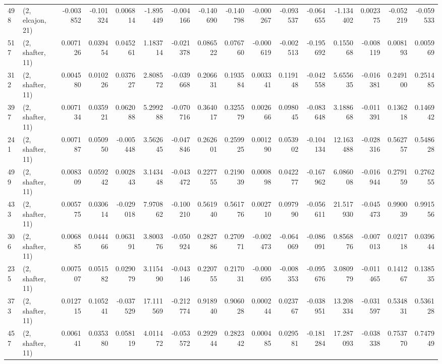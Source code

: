 \begin{tabular}{llrrrrrrrrrrrrrr}
498 &  (2, elcajon, 21) &  -0.003852 & -0.101324 &  0.006814 &   -1.895449 & -0.004166 &  -0.140690 &  -0.140798 & -0.000267 & -0.093537 & -0.064655 &   -1.134402 &  0.002375 &  -0.052219 &  -0.059533 \\
517 &  (2, shafter, 11) &   0.007126 &  0.039454 &  0.045261 &    1.183714 & -0.021378 &   0.086522 &   0.076760 & -0.000619 & -0.002513 & -0.195692 &    0.155068 & -0.008119 &   0.008193 &   0.005969 \\
312 &  (2, shafter, 11) &   0.004580 &  0.010226 &  0.037627 &    2.808572 & -0.039668 &   0.206631 &   0.193584 &  0.003341 &  0.119148 & -0.042558 &    5.655635 & -0.016381 &   0.249100 &   0.251485 \\
397 &  (2, shafter, 11) &   0.007134 &  0.035921 &  0.062088 &    5.299288 & -0.070716 &   0.364017 &   0.325579 &  0.002666 &  0.098045 & -0.083648 &    3.188668 & -0.011391 &   0.136218 &   0.146942 \\
241 &  (2, shafter, 11) &   0.007187 &  0.050950 & -0.005448 &    3.562645 & -0.047846 &   0.262601 &   0.259925 &  0.001290 &  0.053902 & -0.104134 &   12.163488 & -0.028316 &   0.562757 &   0.548628 \\
499 &  (2, shafter, 11) &   0.008309 &  0.059242 &  0.002843 &    3.143448 & -0.043472 &   0.227755 &   0.219039 &  0.000898 &  0.042277 & -0.167962 &    6.086008 & -0.016944 &   0.279159 &   0.276255 \\
433 &  (2, shafter, 11) &   0.005775 &  0.030614 & -0.029018 &    7.970862 & -0.100210 &   0.561940 &   0.561776 &  0.002710 &  0.097990 & -0.056611 &   21.517930 & -0.045473 &   0.990039 &   0.991556 \\
306 &  (2, shafter, 11) &   0.006885 &  0.044466 &  0.063191 &    3.800376 & -0.050924 &   0.282786 &   0.270971 & -0.002473 & -0.064069 & -0.086091 &    0.856876 & -0.007013 &   0.021718 &   0.039644 \\
235 &  (2, shafter, 11) &   0.007507 &  0.051582 &  0.029079 &    3.115490 & -0.043146 &   0.220755 &   0.217031 & -0.000695 & -0.008353 & -0.095676 &    3.080979 & -0.011465 &   0.141267 &   0.138535 \\
373 &  (2, shafter, 11) &   0.012715 &  0.105241 & -0.037529 &   17.111569 & -0.212774 &   0.918940 &   0.906028 &  0.000244 &  0.023767 & -0.038951 &   13.208334 & -0.031597 &   0.534831 &   0.536128 \\
457 &  (2, shafter, 11) &   0.006141 &  0.035380 &  0.058119 &    4.011472 & -0.053572 &   0.292944 &   0.282342 &  0.000485 &  0.029581 & -0.181284 &   17.287093 & -0.038338 &   0.753770 &   0.747949 \\

\end{tabular}
